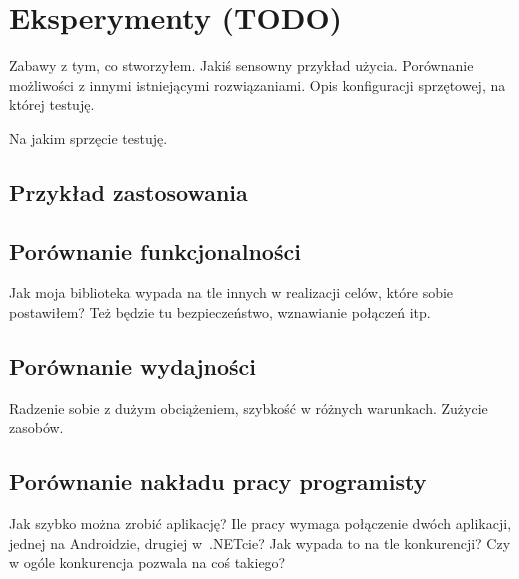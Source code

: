 \chapter{Eksperymenty (TODO)}
Zabawy z tym, co stworzyłem. Jakiś sensowny przykład użycia. Porównanie możliwości z innymi istniejącymi rozwiązaniami. Opis konfiguracji sprzętowej, na której testuję.

%
%
%


Na jakim sprzęcie testuję.

\section{Przykład zastosowania}

\section{Porównanie funkcjonalności}
Jak moja biblioteka wypada na tle innych w realizacji celów, które sobie postawiłem? Też będzie tu bezpieczeństwo, wznawianie połączeń itp.

\section{Porównanie wydajności}
Radzenie sobie z dużym obciążeniem, szybkość w różnych warunkach. Zużycie zasobów.

\section{Porównanie nakładu pracy programisty}
Jak szybko można zrobić aplikację? Ile pracy wymaga połączenie dwóch aplikacji, jednej na Androidzie, drugiej w~.NETcie? Jak wypada to na tle konkurencji? Czy w ogóle konkurencja pozwala na coś takiego?